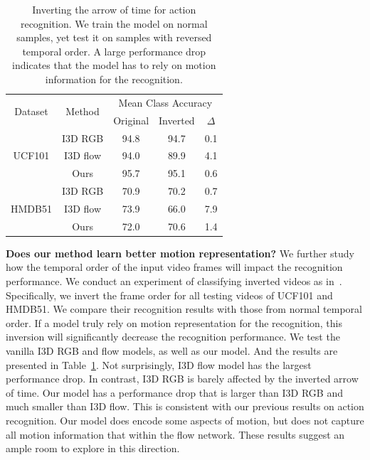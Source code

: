 \documentclass[10pt,twocolumn,letterpaper]{article}
\begin{document}
\begin{table}[t]
\centering
\footnotesize
\begin{tabular}{c|c|ccc}
\multirow{2}{*}{Dataset}        & \multirow{2}{*}{Method}   & \multicolumn{3}{c}{Mean Class Accuracy} \\
    &                           & Original   & Inverted &  $\Delta$ \\ \hline 

\multirow{3}{*}{UCF101}         & I3D RGB  & 94.8 & 94.7     & 0.1  \\
                                & I3D flow & 94.0 & 89.9     & 4.1  \\ 
                                & Ours     & 95.7 & 95.1     &0.6   \\  \hline
\multirow{3}{*}{HMDB51}         & I3D RGB  & 70.9 & 70.2     & 0.7  \\
                                & I3D flow & 73.9 & 66.0     & 7.9 \\ 
                                & Ours     & 72.0 & 70.6     & 1.4  \\
\end{tabular}
\vspace{0.1em}
\caption{Inverting the arrow of time for action recognition. We train the model on normal samples, yet test it on samples with reversed temporal order. A large performance drop indicates that the model has to rely on motion information for the recognition.\vspace{-1em}}
\label{table:arrow}
\end{table}

\noindent \textbf{Does our method learn better motion representation?} We further study how the temporal order of the input video frames will impact the recognition performance. We conduct an experiment of classifying inverted videos as in~\cite{Xie_2018_ECCV, zhou2017temporal}. Specifically, we invert the frame order for all testing videos of UCF101 and HMDB51. We compare their recognition results with those from normal temporal order. If a model truly rely on motion representation for the recognition, this inversion will significantly decrease the recognition performance. We test the vanilla I3D RGB and flow models, as well as our model. And the results are presented in Table~\ref{table:arrow}. Not surprisingly, I3D flow model has the largest performance drop. In contrast, I3D RGB is barely affected by the inverted arrow of time. Our model has a performance drop that is larger than I3D RGB and much smaller than I3D flow. This is consistent with our previous results on action recognition. Our model does encode some aspects of motion, but does not capture all motion information that within the flow network. These results suggest an ample room to explore in this direction. 
\end{document}
